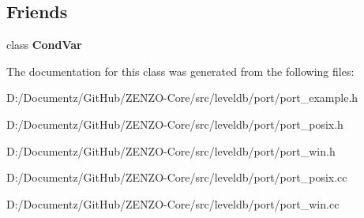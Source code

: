 \subsection*{Friends}
\begin{DoxyCompactItemize}
\item 
\mbox{\label{classleveldb_1_1port_1_1_mutex_a4c7086cb9e92b300d6d5c1eac180e075}} 
class {\bfseries Cond\+Var}
\end{DoxyCompactItemize}


The documentation for this class was generated from the following files\+:\begin{DoxyCompactItemize}
\item 
D\+:/\+Documentz/\+Git\+Hub/\+Z\+E\+N\+Z\+O-\/\+Core/src/leveldb/port/port\+\_\+example.\+h\item 
D\+:/\+Documentz/\+Git\+Hub/\+Z\+E\+N\+Z\+O-\/\+Core/src/leveldb/port/port\+\_\+posix.\+h\item 
D\+:/\+Documentz/\+Git\+Hub/\+Z\+E\+N\+Z\+O-\/\+Core/src/leveldb/port/port\+\_\+win.\+h\item 
D\+:/\+Documentz/\+Git\+Hub/\+Z\+E\+N\+Z\+O-\/\+Core/src/leveldb/port/port\+\_\+posix.\+cc\item 
D\+:/\+Documentz/\+Git\+Hub/\+Z\+E\+N\+Z\+O-\/\+Core/src/leveldb/port/port\+\_\+win.\+cc\end{DoxyCompactItemize}
